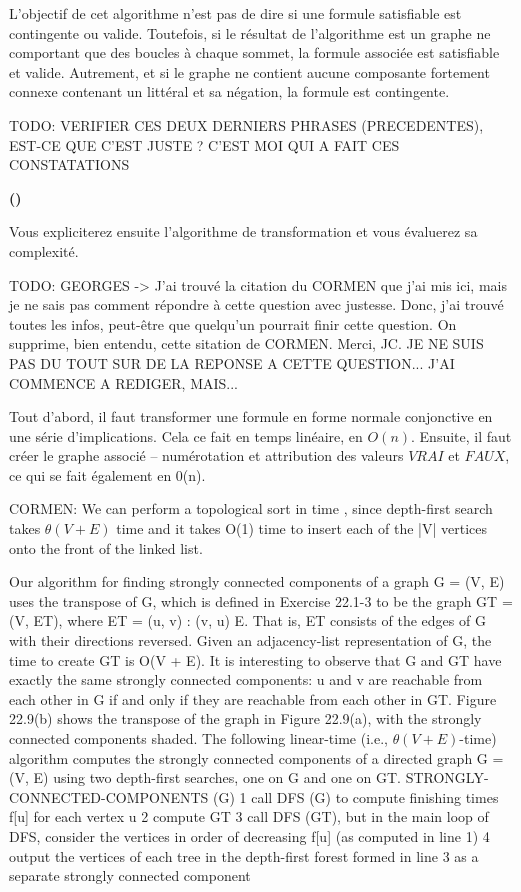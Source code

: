 \documentclass{article}
\newcounter{enoncecount}
\newcounter{sousenoncecount}
\newenvironment{sousenonce}
{
\stepcounter{sousenoncecount}
\bf\small (\alph{sousenoncecount})
\begin{bf}
}
{
\end{bf}
}
\begin{document}
L'objectif de cet algorithme n'est pas de dire si une formule satisfiable est contingente ou valide. Toutefois, si le résultat de l'algorithme est un graphe ne comportant que des boucles à chaque sommet, la formule associée est satisfiable et valide. Autrement, et si le graphe ne contient aucune composante fortement connexe contenant un littéral et sa négation, la formule est contingente.

TODO: VERIFIER CES DEUX DERNIERS PHRASES (PRECEDENTES), EST-CE QUE C'EST JUSTE ? C'EST MOI QUI A FAIT CES CONSTATATIONS 

\begin{sousenonce}
Vous expliciterez ensuite l'algorithme de transformation et vous évaluerez sa complexité.
\end{sousenonce}

TODO: GEORGES -> J'ai trouvé la citation du CORMEN que j'ai mis ici, mais je ne sais pas comment répondre à cette question avec justesse. Donc, j'ai trouvé toutes les infos, peut-être que quelqu'un pourrait finir cette question. On supprime, bien entendu, cette sitation de CORMEN. Merci, JC.
JE NE SUIS PAS DU TOUT SUR DE LA REPONSE A CETTE QUESTION... J'AI COMMENCE A REDIGER, MAIS...

Tout d'abord, il faut transformer une formule en forme normale conjonctive en une série d'implications. Cela ce fait en temps linéaire, en $O(n)$. Ensuite, il faut créer le graphe associé -- numérotation et attribution des valeurs $VRAI$ et $FAUX$, ce qui se fait également en 0(n). 


CORMEN:
We can perform a topological sort in time , since depth-first search takes $\theta(V + E)$
time and it takes O(1) time to insert each of the |V| vertices onto the front of the linked list.


Our algorithm for finding strongly connected components of a graph G = (V, E) uses the
transpose of G, which is defined in Exercise 22.1-3 to be the graph GT = (V, ET), where ET =
{(u, v) : (v, u) E}. That is, ET consists of the edges of G with their directions reversed. Given
an adjacency-list representation of G, the time to create GT is O(V + E). It is interesting to
observe that G and GT have exactly the same strongly connected components: u and v are
reachable from each other in G if and only if they are reachable from each other in GT. Figure
22.9(b) shows the transpose of the graph in Figure 22.9(a), with the strongly connected
components shaded.
The following linear-time (i.e., $\theta(V + E)$-time) algorithm computes the strongly connected
components of a directed graph G = (V, E) using two depth-first searches, one on G and one
on GT.
STRONGLY-CONNECTED-COMPONENTS (G)
1 call DFS (G) to compute finishing times f[u] for each vertex u
2 compute GT
3 call DFS (GT), but in the main loop of DFS, consider the vertices
in order of decreasing f[u] (as computed in line 1)
4 output the vertices of each tree in the depth-first forest formed in
line 3 as a
separate strongly connected component
\end{document}
